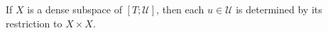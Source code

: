If $X$ is a dense subspace of $[T; \mathcal{U}]$, then each $u \in \mathcal{U}$ is determined by its restriction to $X \times X$.

